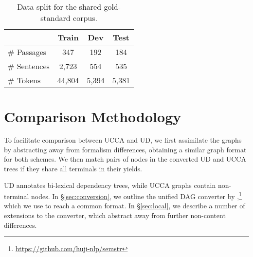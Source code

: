 \documentclass[11pt,a4paper,table]{article}
\begin{document}
\begin{table}[t]
\centering
\begin{tabular}{l|ccc}
& \bf \footnotesize Train & \bf \footnotesize Dev & \bf \footnotesize Test \\
\hline
\# Passages & \hphantom{00,}347 & \hphantom{0,}192 & \hphantom{0,}184 \\
\# Sentences & \hphantom{0}2,723 & \hphantom{0,}554 & \hphantom{0,}535 \\
\# Tokens & 44,804 & 5,394 & 5,381 \\
\end{tabular}
\caption{Data split for the shared gold-standard corpus.\label{tab:data}}
\end{table}

\section{Comparison Methodology}\label{sec:methodology}

To facilitate comparison between UCCA and UD,
we first assimilate the graphs by abstracting away from formalism differences,
obtaining a similar graph format for both schemes.
We then match pairs of nodes in the converted UD and UCCA trees
if they share all terminals in their yields.

UD annotates bi-lexical dependency trees,
while UCCA graphs contain non-terminal nodes.
In \S\ref{sec:conversion}, we outline the unified DAG converter by
\citet{hershcovich2018multitask,hershcovich2018universal},\footnote{\url{https://github.com/huji-nlp/semstr}}
which we use to reach a common format.
In \S\ref{sec:local}, we describe a number of extensions
to the converter, which abstract away from further non-content differences.
\end{document}
